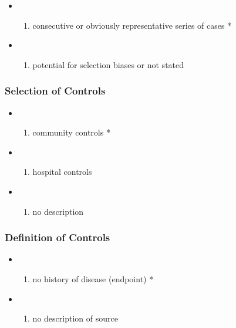 \documentclass[
  doc, a4paper]{apa7}
\providecommand{\tightlist}{%
  \setlength{\itemsep}{0pt}\setlength{\parskip}{0pt}}
\begin{document}
\begin{itemize}
\tightlist
\item
  \begin{enumerate}
  \def\labelenumi{\alph{enumi})}
  \tightlist
  \item
    consecutive or obviously representative series of cases *
  \end{enumerate}
\item
  \begin{enumerate}
  \def\labelenumi{\alph{enumi})}
  \setcounter{enumi}{1}
  \tightlist
  \item
    potential for selection biases or not stated
  \end{enumerate}
\end{itemize}

\subsubsection{Selection of Controls}\label{selection-of-controls}

\begin{itemize}
\tightlist
\item
  \begin{enumerate}
  \def\labelenumi{\alph{enumi})}
  \tightlist
  \item
    community controls *
  \end{enumerate}
\item
  \begin{enumerate}
  \def\labelenumi{\alph{enumi})}
  \setcounter{enumi}{1}
  \tightlist
  \item
    hospital controls
  \end{enumerate}
\item
  \begin{enumerate}
  \def\labelenumi{\alph{enumi})}
  \setcounter{enumi}{2}
  \tightlist
  \item
    no description
  \end{enumerate}
\end{itemize}

\subsubsection{Definition of Controls}\label{definition-of-controls}

\begin{itemize}
\tightlist
\item
  \begin{enumerate}
  \def\labelenumi{\alph{enumi})}
  \tightlist
  \item
    no history of disease (endpoint) *
  \end{enumerate}
\item
  \begin{enumerate}
  \def\labelenumi{\alph{enumi})}
  \setcounter{enumi}{1}
  \tightlist
  \item
    no description of source
  \end{enumerate}
\end{itemize}
\end{document}
